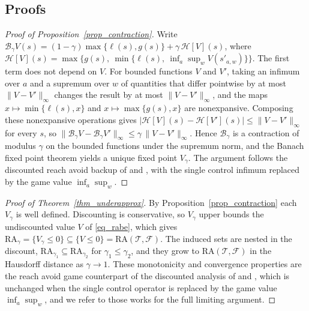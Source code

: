 \documentclass[5p,times,authoryear]{elsarticle}
\begin{document}
\begin{appendices}
\section{Proofs}\label{app_proofs}
\begin{proof}[Proof of Proposition~\ref{prop_contraction}]
Write $\mathcal{B}_\gamma V(s) = (1-\gamma)\max\{\ell(s),g(s)\} + \gamma\,\mathcal{H}[V](s)$, where $\mathcal{H}[V](s) = \max\{g(s),\ \min\{\ell(s),\ \inf_{a}\sup_{w} V(s'_{a,w})\}\}$. The first term does not depend on $V$. For bounded functions $V$ and $V'$, taking an infimum over $a$ and a supremum over $w$ of quantities that differ pointwise by at most $\|V-V'\|_\infty$ changes the result by at most $\|V-V'\|_\infty$, and the maps $x\mapsto\min\{\ell(s),x\}$ and $x\mapsto\max\{g(s),x\}$ are nonexpansive. Composing these nonexpansive operations gives $|\mathcal{H}[V](s)-\mathcal{H}[V'](s)|\le\|V-V'\|_\infty$ for every $s$, so $\|\mathcal{B}_\gamma V-\mathcal{B}_\gamma V'\|_\infty\le\gamma\,\|V-V'\|_\infty$. Hence $\mathcal{B}_\gamma$ is a contraction of modulus $\gamma$ on the bounded functions under the supremum norm, and the Banach fixed point theorem yields a unique fixed point $V_\gamma$. The argument follows the discounted reach avoid backup of \citet{hsu2021safety} and \citet{fisac2019bridging}, with the single control infimum replaced by the game value $\inf_{a}\sup_{w}$.
\end{proof}
\begin{proof}[Proof of Theorem~\ref{thm_underapprox}]
By Proposition~\ref{prop_contraction} each $V_\gamma$ is well defined. Discounting is conservative, so $V_\gamma$ upper bounds the undiscounted value $V$ of \eqref{eq_rabe}, which gives $\mathrm{RA}_\gamma=\{V_\gamma\le 0\}\subseteq\{V\le 0\}=\mathrm{RA}(\mathcal{T},\mathcal{F})$. The induced sets are nested in the discount, $\mathrm{RA}_{\gamma_1}\subseteq\mathrm{RA}_{\gamma_2}$ for $\gamma_1\le\gamma_2$, and they grow to $\mathrm{RA}(\mathcal{T},\mathcal{F})$ in the Hausdorff distance as $\gamma\to 1$. These monotonicity and convergence properties are the reach avoid game counterpart of the discounted analysis of \citet{fisac2019bridging} and \citet{hsu2021safety}, which is unchanged when the single control operator is replaced by the game value $\inf_{a}\sup_{w}$, and we refer to those works for the full limiting argument.
\end{proof}
\end{appendices}




\end{document}
